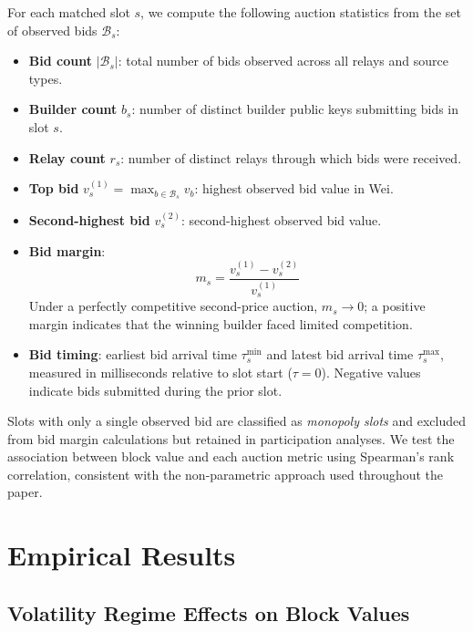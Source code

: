 \documentclass[11pt]{article}
\begin{document}
For each matched slot $s$, we compute the following auction statistics from the
set of observed bids $\mathcal{B}_s$:

\begin{itemize}
\item \textbf{Bid count} $|\mathcal{B}_s|$: total number of bids observed
across all relays and source types.
\item \textbf{Builder count} $b_s$: number of distinct builder public keys
submitting bids in slot $s$.
\item \textbf{Relay count} $r_s$: number of distinct relays through which bids
were received.
\item \textbf{Top bid} $v_s^{(1)} = \max_{b \in \mathcal{B}_s} v_b$: highest
observed bid value in Wei.
\item \textbf{Second-highest bid} $v_s^{(2)}$: second-highest observed bid
value.
\item \textbf{Bid margin}:
\begin{equation}
m_s = \frac{v_s^{(1)} - v_s^{(2)}}{v_s^{(1)}}
\label{eq:margin}
\end{equation}
Under a perfectly competitive second-price auction, $m_s \to 0$; a positive
margin indicates that the winning builder faced limited competition.
\item \textbf{Bid timing}: earliest bid arrival time $\tau_s^{\min}$ and latest
bid arrival time $\tau_s^{\max}$, measured in milliseconds relative to slot
start ($\tau = 0$). Negative values indicate bids submitted during the prior
slot.
\end{itemize}

Slots with only a single observed bid are classified as \textit{monopoly slots}
and excluded from bid margin calculations but retained in participation analyses.
We test the association between block value and each auction metric using
Spearman's rank correlation, consistent with the non-parametric approach used
throughout the paper.

\section{Empirical Results}
\label{sec:results}

\subsection{Volatility Regime Effects on Block Values}
\label{sec:vol_regimes}
\end{document}
